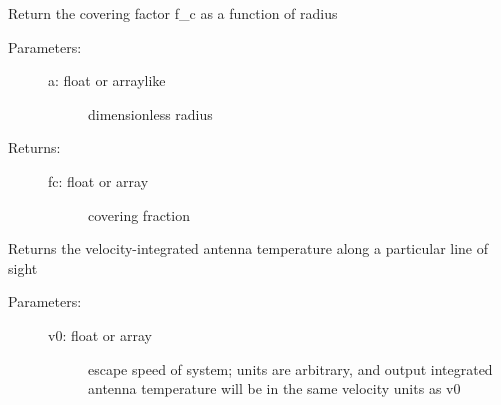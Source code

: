 \documentclass[letterpaper,10pt,english]{sphinxmanual}
\begin{document}
\begin{fulllineitems}
\begin{fulllineitems}
\begin{description}
\begin{description}
\end{description}

\end{description}

\end{fulllineitems}


\begin{fulllineitems}
\label{fulldoc:despotic.winds.pwind.fc}
Return the covering factor f\_c as a function of radius
\begin{description}
\item[{Parameters:}] \leavevmode\begin{description}
\item[{a: float or arraylike}] \leavevmode
dimensionless radius

\end{description}

\item[{Returns:}] \leavevmode\begin{description}
\item[{fc: float or array}] \leavevmode
covering fraction

\end{description}

\end{description}

\end{fulllineitems}


\begin{fulllineitems}
\label{fulldoc:despotic.winds.pwind.intTA_LTE}
Returns the velocity-integrated antenna temperature along 
a particular line of sight
\begin{description}
\item[{Parameters:}] \leavevmode\begin{description}
\item[{v0: float or array}] \leavevmode
escape speed of system; units are arbitrary, and output
integrated antenna temperature will be in the same
velocity units as v0


\end{description}
\end{description}
\end{fulllineitems}
\end{fulllineitems}
\end{document}
